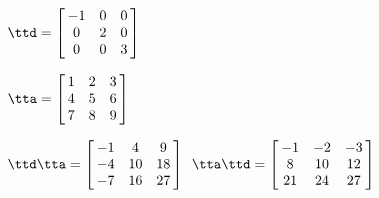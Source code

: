 {$\ttd = \left[\hskip -3pt \begin{array}{ccc} -1&0&0\\  0&2&0
\\  0&0&3\end{array}\hskip -3pt \right]$

$\tta = \left[\hskip -3pt \begin{array}{ccc} 1&2&3\\  4&5&6
\\  7&8&9\end{array}\hskip -3pt \right] $}
{$\ttd\tta= \left[\hskip -3pt \begin{array}{ccc} -1&4&9\\  -4&10&18
\\  -7&16&27\end{array}\hskip -3pt \right]$\ 
$\tta\ttd = \left[\hskip -3pt \begin{array}{ccc} -1&-2&-3\\  8&10&12
\\  21&24&27\end{array}\hskip -3pt \right] $
}



